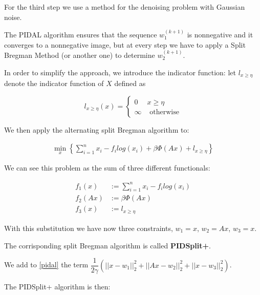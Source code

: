 For the third step we use a method for the denoising problem with Gaussian noise.

The PIDAL algorithm ensures that the sequence $w_1^{(k+1)}$ is nonnegative and it converges to a nonnegative image, but at every step we have to apply a Split Bregman Method (or another one) to determine $w_2^{(k+1)}$.

In order to simplify the approach, we introduce the indicator function: let $l_{x \geq \eta}$ denote the indicator function of $X$ defined as

$$ l_{x \geq \eta} (x) = \left \{ \begin{array}{ll}
0 & x \geq \eta \\
\infty & \mbox{ otherwise}\end{array} \right.
$$

We then apply the alternating split Bregman algorithm to:

\begin{align} \label{pidal}
\min_x \left\{ \sum_{i=1}^n x_i - f_i log(x_i) + \beta \Phi(Ax) + l_{x\geq \eta} \right\}
\end{align}

We can see this problem as the sum of three different functionals:

\begin{align*}
f_1(x) &:= \sum_{i=1}^n x_i - f_i log(x_i) \\
f_2(Ax) &:= \beta \Phi(Ax) \\
f_3(x) &:= l_{x\geq \eta}
\end{align*}

With this substitution we have now three constraints, $w_1 = x$, $w_2 = Ax$, $w_3 = x$.

The corrisponding split Bregman algorithm is called \textbf{PIDSplit+}.

We add to \eqref{pidal} the term $\dfrac{1}{2\gamma}\left(||x-w_1||_2^2 + ||Ax-w_2 ||_2^2 + ||x-w_3||_2^2\right)$.

The PIDSplit+ algorithm is then:

